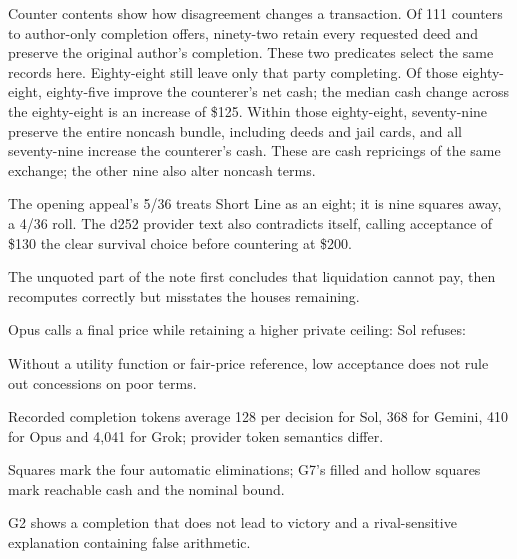 Counter contents show how disagreement changes a transaction. Of 111 counters to author-only completion offers, ninety-two retain every requested deed and preserve the original author's completion. These two predicates select the same records here. Eighty-eight still leave only that party completing. Of those eighty-eight, eighty-five improve the counterer's net cash; the median cash change across the eighty-eight is an increase of \$125. Within those eighty-eight, seventy-nine preserve the entire noncash bundle, including deeds and jail cards, and all seventy-nine increase the counterer's cash. These are cash repricings of the same exchange; the other nine also alter noncash terms.

The opening appeal's 5/36 treats Short Line as an eight; it is nine squares away, a 4/36 roll. The d252 provider text also contradicts itself, calling acceptance of \$130 the clear survival choice before countering at \$200.

The unquoted part of the note first concludes that liquidation cannot pay, then recomputes correctly but misstates the houses remaining.

Opus calls a final price while retaining a higher private ceiling:
Sol refuses:

Without a utility function or fair-price reference, low acceptance does not rule out concessions on poor terms.

Recorded completion tokens average 128 per decision for Sol, 368 for Gemini, 410 for Opus and 4,041 for Grok; provider token semantics differ.

Squares mark the four automatic eliminations; G7's filled and hollow squares mark reachable cash and the nominal bound.

G2 shows a completion that does not lead to victory and a rival-sensitive explanation containing false arithmetic.
